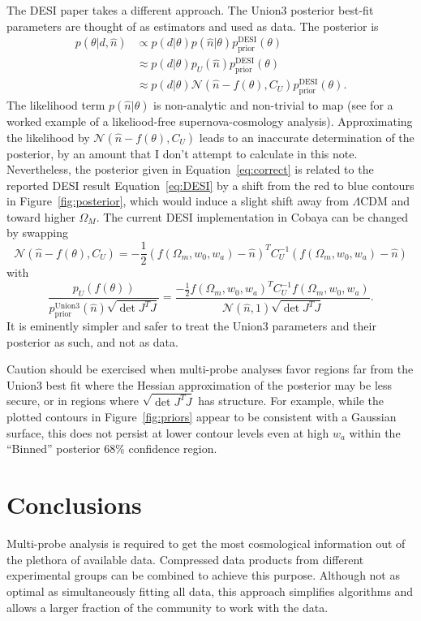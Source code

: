 \documentclass[11pt,a4paper]{article}
\begin{document}
The DESI paper takes a different approach.  The Union3 posterior best-fit parameters are thought of as estimators and used as
 data.  The posterior is
\begin{align}
p(\theta | d, \hat{n}) & \propto p(d| \theta) p( \hat{n}| \theta) p^\text{DESI}_\text{prior}(\theta) \\
& \approx p(d| \theta) p_U(\hat{n})  p^\text{DESI}_\text{prior}(\theta)  \\
& \approx p(d| \theta) \mathcal{N}( \hat{n}-f(\theta) , C_U)  p^\text{DESI}_\text{prior}(\theta) \label{eq:DESI}.
\end{align}
The  likelihood
 term $ p( \hat{n}| \theta)$ is non-analytic and non-trivial to map
(see \cite{2013ApJ...764..116W} for a worked example of a likeliood-free supernova-cosmology analysis).
Approximating the likelihood
by $\mathcal{N}( \hat{n}-f(\theta) , C_U)$ leads to an inaccurate determination
of the posterior, by an amount that I don't attempt to calculate in this note.
Nevertheless, the posterior given in Equation~\ref{eq:correct} is related to the reported DESI result Equation~\ref{eq:DESI}
by a shift from the red to blue contours in Figure~\ref{fig:posterior}, which would induce a slight shift away from $\Lambda$CDM
and toward higher $\Omega_M$.
The current DESI implementation in Cobaya can be changed by swapping
\begin{equation}
 \mathcal{N}( \hat{n}-f(\theta) , C_U) = -\frac{1}{2} (f(\Omega_m, w_0, w_a) - \hat{n})^T C_U^{-1} (f(\Omega_m, w_0, w_a) - \hat{n})
\end{equation}
with
\begin{equation}
 \frac{p_U(f(\theta))} {p^\text{Union3}_\text{prior}(\hat{n}) \sqrt{\det{J^TJ}}} =\frac{ -\frac{1}{2} f(\Omega_m, w_0, w_a) ^T C_U^{-1}  f(\Omega_m, w_0, w_a) }
 {\mathcal{N}(\hat{n},1) \sqrt{\det{J^TJ}}}.
\end{equation}
It is eminently simpler and safer to treat the Union3 parameters and their posterior as such, and not as data.


Caution should be exercised when multi-probe analyses favor regions far from the Union3 best fit  where the Hessian approximation of the
posterior may be less secure, or in regions where $\sqrt{\det{J^TJ}}$ has structure.  For example, while the plotted contours in Figure~\ref{fig:priors}
appear to be consistent with a Gaussian surface, this does not persist at lower contour levels even at high $w_a$ within the ``Binned'' posterior 68\% confidence region.

\section{Conclusions}
\label{sec:conclusions}
Multi-probe  analysis is required to get the most cosmological information out of the plethora of available data. 
Compressed data products from different experimental groups can be combined to achieve this purpose.
Although not as optimal as simultaneously fitting all data, this approach simplifies algorithms and allows a larger
fraction of
the community to work with the data.
\end{document}
